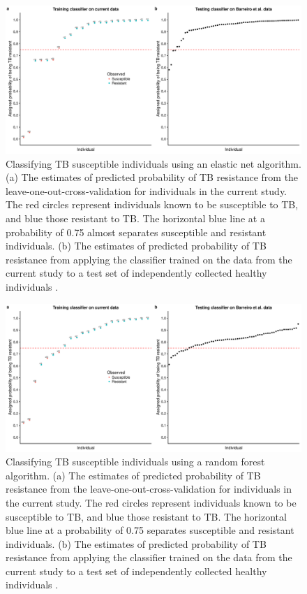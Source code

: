 \documentclass[fleqn,10pt]{wlscirep}
\begin{document}
\begin{figure}[ht]
\centering
\includegraphics[width=\linewidth]{../figure/classifier-en.pdf}
\caption{
Classifying TB susceptible individuals using an elastic net algorithm.
(a) The estimates of predicted probability of TB resistance from the
leave-one-out-cross-validation for individuals in the current study.
The red circles represent individuals known to be susceptible to TB,
and blue those resistant to TB. The horizontal blue line at a
probability of 0.75 almost separates susceptible and resistant
individuals. (b) The estimates of predicted probability of TB
resistance from applying the classifier trained on the data from the
current study to a test set of independently collected healthy
individuals \cite{Barreiro2012}.
}
\label{fig:class-en}
\end{figure}

\begin{figure}[ht]
\centering
\includegraphics[width=\linewidth]{../figure/classifier-rf.pdf}
\caption{
Classifying TB susceptible individuals using a random forest
algorithm. (a) The estimates of predicted probability of TB resistance
from the leave-one-out-cross-validation for individuals in the current
study. The red circles represent individuals known to be susceptible
to TB, and blue those resistant to TB. The horizontal blue line at a
probability of 0.75 separates susceptible and resistant individuals.
(b) The estimates of predicted probability of TB resistance from
applying the classifier trained on the data from the current study to
a test set of independently collected healthy individuals
\cite{Barreiro2012}.
}
\label{fig:class-rf}
\end{figure}
\end{document}

